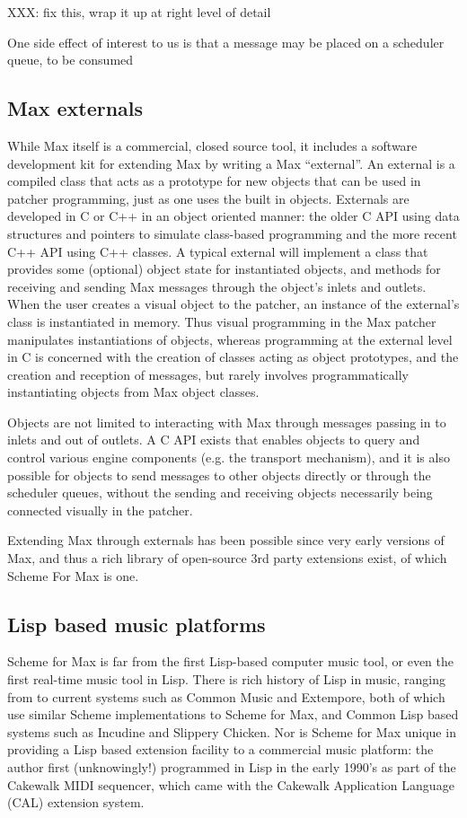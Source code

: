 \documentclass[acmsmall]{acmart}
\begin{document}
XXX: fix this, wrap it up at right level of detail
 
One side effect of interest to us is that a message may be placed on a scheduler queue, to be consumed

\subsection{Max externals}
While Max itself is a commercial, closed source tool, it includes a software development kit for 
extending Max by writing a Max “external”. An external is a compiled class that acts as a prototype 
for new objects that can be used in patcher programming, just as one uses the built in objects.
Externals are developed in C or C++ in an object oriented manner: the older C API using data 
structures and pointers to simulate class-based programming and the more recent C++ API using C++ classes.
A typical external will implement a class that provides some (optional) object state for instantiated
objects, and 
methods for receiving and sending Max messages through the object’s inlets and outlets. When the user 
creates a visual object to the patcher, an instance of the external’s class is instantiated in memory.
Thus visual programming in the Max patcher manipulates instantiations of objects, whereas programming
at the external level in C is concerned with the creation of classes acting as object prototypes, and
the creation and reception of messages, but rarely involves programmatically instantiating objects 
from Max object classes.

Objects are not limited to interacting with Max through messages passing in to inlets and out of 
outlets. A C API exists that enables objects to query and control various engine components (e.g. 
the transport mechanism), and it is also possible for objects to send messages to other objects 
directly or through the scheduler queues, without the sending and receiving objects 
necessarily being connected visually in the patcher. 

Extending Max through externals has been possible since very early versions of Max, and thus a rich
library of open-source 3rd party extensions exist, of which Scheme For Max is one. 

\subsection{Lisp based music platforms}
Scheme for Max is far from the first Lisp-based computer music tool, or even
the first real-time music tool in Lisp. There is rich history of Lisp in music, 
ranging from %
to current systems such as Common Music and Extempore, both of which use similar 
Scheme implementations to Scheme for Max, and Common Lisp based systems such as
Incudine and Slippery Chicken. Nor is Scheme for Max unique in providing a Lisp
based extension facility to a commercial music platform: the author first (unknowingly!)
programmed in Lisp in the early 1990's as part of the Cakewalk MIDI sequencer,
which came with the Cakewalk Application Language (CAL) extension system.
\end{document}
